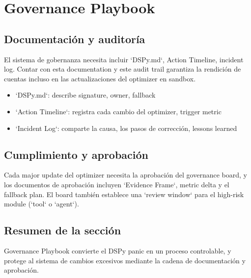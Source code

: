 \section{Governance Playbook}

\subsection{Documentación y auditoría}

El sistema de gobernanza necesita incluir `DSPy.md`, Action Timeline, incident log. Contar con esta documentation y este audit trail garantiza la rendición de cuentas incluso en las actualizaciones del optimizer en sandbox.

\begin{itemize}
    \item `DSPy.md`: describe signature, owner, fallback
    \item `Action Timeline`: registra cada cambio del optimizer, trigger metric
    \item `Incident Log`: comparte la causa, los pasos de corrección, lessons learned
\end{itemize}

\subsection{Cumplimiento y aprobación}

Cada major update del optimizer necesita la aprobación del governance board, y los documentos de aprobación incluyen `Evidence Frame`, metric delta y el fallback plan. El board también establece una `review window` para el high-risk module (`tool` o `agent`).

\subsection{Resumen de la sección}

Governance Playbook convierte el DSPy panic en un proceso controlable, y protege al sistema de cambios excesivos mediante la cadena de documentación y aprobación.

